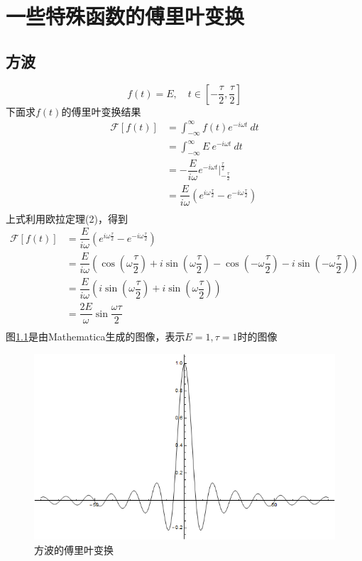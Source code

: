 \documentclass[UTF8]{ctexbook}
\begin{document}
	\chapter{一些特殊函数的傅里叶变换}
		\section{方波}
			\begin{equation}
				f(t)=E, \quad t\in \left[-\frac{\tau}{2}, \frac{\tau}{2}\right]
			\end{equation}
			下面求$f(t)$的傅里叶变换结果
			\begin{equation}
				\begin{split}
					\mathscr{F}[f(t)] &= \int_{-\infty}^{\infty}f(t)e^{-i\omega t}\ dt\\
					&= \int_{-\infty}^{\infty}E\ e^{-i\omega t}\ dt\\
					&= -\dfrac{E}{i\omega}e^{-i\omega t}|_{-\frac{\tau}{2}}^{\frac{\tau}{2}}\\
					&= \dfrac{E}{i\omega}(e^{i\omega \frac{\tau}{2}}-e^{-i\omega\frac{\tau}{2}})\\
				\end{split}
			\end{equation}
			上式利用欧拉定理(2)，得到
			\begin{equation}
				\begin{split}
					\mathscr{F}[f(t)] &= \dfrac{E}{i\omega}(e^{i\omega \frac{\tau}{2}}-e^{-i\omega\frac{\tau}{2}})\\
					&= \dfrac{E}{i\omega}(\cos (\omega \dfrac{\tau}{2}) +i \sin(\omega \dfrac{\tau}{2})-\cos (-\omega \dfrac{\tau}{2}) -i \sin(-\omega \dfrac{\tau}{2}))\\
					&= \dfrac{E}{i\omega}(i \sin(\omega \dfrac{\tau}{2}) +i \sin(\omega \dfrac{\tau}{2}))\\
					&= \dfrac{2E}{\omega}\sin\dfrac{\omega\tau}{2}\\
				\end{split}
			\end{equation}
			图\ref{fig1}是由Mathematica生成的图像，表示$E = 1, \tau = 1$时的图像
			
			\begin{figure}[h]
				\centering
				\includegraphics[scale=0.3]{1.png}
				\caption{方波的傅里叶变换}
				\label{fig1}
			\end{figure}
\end{document}
